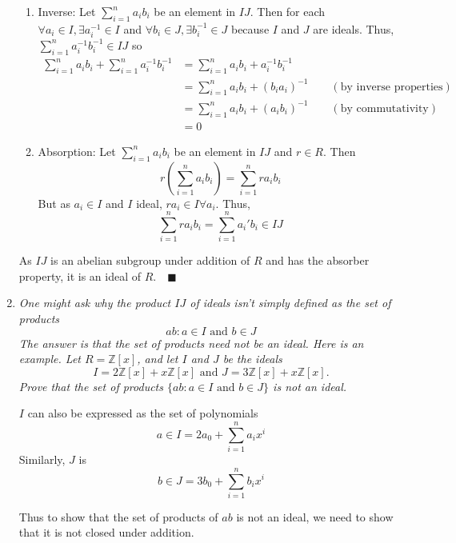 \documentclass[12pt]{article}
\newcommand{\Z}{\mathbb{Z}}
\newcommand{\qed}{\quad \blacksquare}
\begin{document}
\begin{enumerate}[label=(\alph*)]
\begin{enumerate}
                    \item Inverse: Let $\sum_{i=1}^n a_i b_i$ be an element in $IJ$. Then for each $\forall a_i \in I, \exists a_i^{-1} \in I$ and $\forall b_i \in J, \exists b_i^{-1} \in J$ because $I$ and $J$ are ideals. Thus, $\sum_{i=1}^n a_i^{-1} b_i^{-1} \in IJ$ so 
                    \begin{align*}
                        \sum_{i=1}^n a_i b_i + \sum_{i=1}^n a_i^{-1}b_i^{-1} &= \sum_{i=1}^n a_i b_i + a_i^{-1}b_i^{-1}\\
                        &= \sum_{i=1}^n a_i b_i + (b_ia_i)^{-1} \qquad (\text{by inverse properties})\\ 
                        &= \sum_{i=1}^n a_i b_i + (a_ib_i)^{-1} \qquad (\text{by commutativity})\\
                        &= 0
                    \end{align*}
                    
                    \item Absorption: Let $\sum_{i=1}^n a_i b_i$ be an element in $IJ$ and $r \in R$. Then 
                    \[r\left(\sum_{i=1}^n a_i b_i\right) = \sum_{i=1}^n ra_i b_i\]
                    But as $a_i \in I$ and $I$ ideal, $ra_i \in I \forall a_i$. Thus, 
                    \[\sum_{i=1}^n ra_i b_i = \sum_{i=1}^n a_i' b_i \in IJ\]

                \end{enumerate}
                As $IJ$ is an abelian subgroup under addition of $R$ and has the absorber property, it is an ideal of $R. \qed$

            \color{black}

        \item \emph{One might ask why the product $IJ$ of ideals isn't simply defined as the set of products} 
        \[{ab : a \in I \text{ and } b \in J}\] 
        \emph{The answer is that the set of products need not be an ideal. Here is an example. Let $R = \Z[x]$, and let $I$ and $J$ be the ideals}
        \[I = 2\Z[x] + x\Z[x] \text{ and } J = 3\Z[x] + x\Z[x].\]
        \emph{Prove that the set of products $\{ab : a \in I \text{ and } b \in J\}$ is not an ideal.}

            \color{blue}
                $I$ can also be expressed as the set of polynomials 
                \[a \in I = 2a_0 + \sum_{i=1}^n a_ix^i\] 
                Similarly, $J$ is  
                \[b\in J = 3b_0 + \sum_{i=1}^n b_ix^i\]
                
                Thus to show that the set of products of $ab$ is not an ideal, we need to show that it is not closed under addition. 


\end{enumerate}
\end{document}
